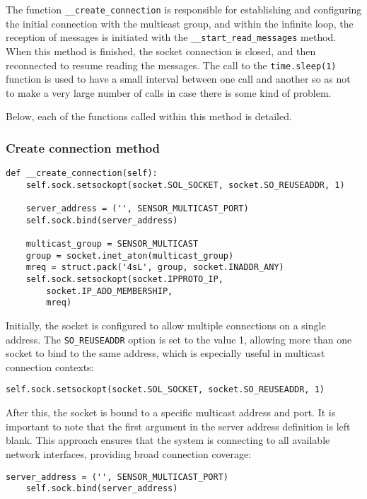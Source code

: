 The function \texttt{\_\_create\_connection} is responsible for establishing and configuring the initial connection with the multicast group, and within the infinite loop, the reception of messages is initiated with the \texttt{\_\_start\_read\_messages} method. When this method is finished, the socket connection is closed, and then reconnected to resume reading the messages. The call to the \texttt{time.sleep(1)} function is used to have a small interval between one call and another so as not to make a very large number of calls in case there is some kind of problem.

Below, each of the functions called within this method is detailed.

\subsubsection[Create connection method]{Create connection method}

\begin{Verbatim}[fontsize=\small, baselinestretch=0.8]
def __create_connection(self):
    self.sock.setsockopt(socket.SOL_SOCKET, socket.SO_REUSEADDR, 1)

    server_address = ('', SENSOR_MULTICAST_PORT)
    self.sock.bind(server_address)

    multicast_group = SENSOR_MULTICAST
    group = socket.inet_aton(multicast_group)
    mreq = struct.pack('4sL', group, socket.INADDR_ANY)
    self.sock.setsockopt(socket.IPPROTO_IP,
        socket.IP_ADD_MEMBERSHIP,
        mreq)
\end{Verbatim}

Initially, the socket is configured to allow multiple connections on a single address. The \texttt{SO\_REUSEADDR} option is set to the value 1, allowing more than one socket to bind to the same address, which is especially useful in multicast connection contexts:

\begin{Verbatim}[fontsize=\small, baselinestretch=0.8]
    self.sock.setsockopt(socket.SOL_SOCKET, socket.SO_REUSEADDR, 1)
\end{Verbatim}

After this, the socket is bound to a specific multicast address and port. It is important to note that the first argument in the server address definition is left blank. This approach ensures that the system is connecting to all available network interfaces, providing broad connection coverage:

\begin{Verbatim}[fontsize=\small, baselinestretch=0.8]
    server_address = ('', SENSOR_MULTICAST_PORT)
    self.sock.bind(server_address)
\end{Verbatim}

